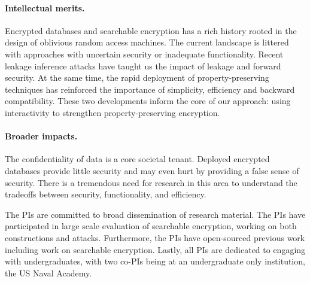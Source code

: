 \paragraph{Intellectual merits.}  
Encrypted databases and searchable encryption has a rich history rooted in the
design of oblivious random access machines.  The current landscape is littered
with approaches with uncertain security or inadequate functionality.  Recent
leakage inference attacks have taught us the impact of leakage and forward
security.  At the same time, the rapid deployment of property-preserving
techniques has reinforced the importance of simplicity, efficiency and backward
compatibility.  These two developments inform the core of our approach: using
interactivity to strengthen property-preserving encryption.

\paragraph{Broader impacts.}
The confidentiality of data is a core societal tenant.  Deployed encrypted
databases provide little security and may even hurt by providing a false sense
of security.  There is a tremendous need for research in this area to
understand the tradeoffs between security, functionality, and efficiency.

The PIs are committed to broad dissemination of research material.  The PIs
have participated in large scale evaluation of searchable encryption, working
on both constructions and attacks.  Furthermore, the PIs have open-sourced
previous work including work on searchable encryption.  Lastly, all PIs are
dedicated to engaging with undergraduates, with two co-PIs being at an
undergraduate only institution, the US Naval Academy.  




